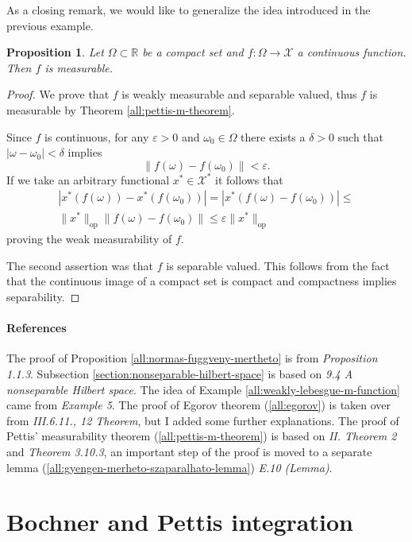 \documentclass[a4paper, 12pt]{article}
\newtheorem{state}[lem]{Proposition}
\begin{document}
As a closing remark, we would like to generalize the idea introduced in the previous example.
\begin{state} Let $\Omega \subset \mathbb{R}$ be a compact set and $f \colon \Omega \to \mathcal{X}$ a continuous function. Then $f$ is measurable.
\end{state}
\begin{proof} We prove that $f$ is weakly measurable and separable valued, thus $f$ is measurable by Theorem \ref{all:pettis-m-theorem}. 

Since $f$ is continuous, for any $\varepsilon > 0$ and $\omega_0 \in \Omega$ there exists a $\delta > 0$ such that $|\omega - \omega_0| < \delta$ implies
$$\| f(\omega) - f(\omega_0) \| < \varepsilon.$$
If we take an arbitrary functional $x^* \in \mathcal{X}^{*}$ it follows that
\begin{equation*}
\begin{split}
|x^*(f(\omega)) - x^*(f(\omega_0))| = |x^*(f(\omega)-f(\omega_0))| \leqslant \\ \| x^* \|_{\mathrm{op}} \|f(\omega) -f(\omega_0)\| \leqslant \varepsilon \| x^* \|_{\mathrm{op}}
\end{split}
\end{equation*}
proving the weak measurability of $f$.

The second assertion was that $f$ is separable valued. This follows from the fact that the continuous image of a compact set is compact and compactness implies separability.
\end{proof}
\paragraph*{References} The proof of Proposition \ref{all:normas-fuggveny-mertheto} is from \cite{schwabik} \textit{Proposition 1.1.3}. Subsection \ref{section:nonseparable-hilbert-space} is based on \cite{bachman} \textit{9.4 A nonseparable Hilbert space}. The idea of Example \ref{all:weakly-lebesgue-m-function} came from \cite{diestel-uhl} \textit{Example 5}. The proof of Egorov theorem (\ref{all:egorov}) is taken over from \cite{dunford-schwartz} \textit{III.6.11., 12 Theorem}, but I added some further explanations. The proof of Pettis' measurability theorem (\ref{all:pettis-m-theorem}) is based on \cite{diestel-uhl} \textit{II. Theorem 2} and \cite{denkowski-migorski-papageorgiou} \textit{Theorem 3.10.3}, an important step of the proof is moved to a separate lemma (\ref{all:gyengen-merheto-szaparalhato-lemma}) \cite{cohn} \textit{E.10 (Lemma)}.
\section{Bochner and Pettis integration}\label{sec:bochnerpettis}
\end{document}

